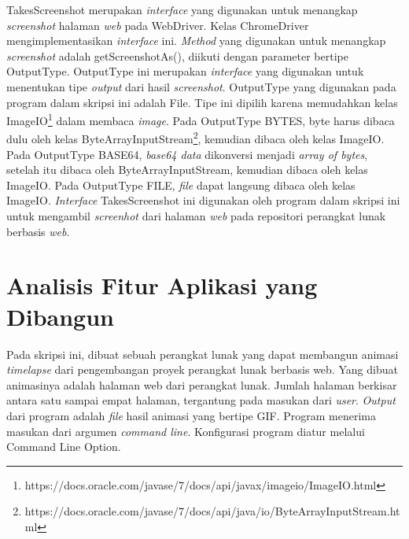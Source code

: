 TakesScreenshot merupakan \textit{interface} yang digunakan untuk menangkap \textit{screenshot} halaman \textit{web} pada WebDriver. Kelas ChromeDriver mengimplementasikan \textit{interface} ini. \textit{Method} yang digunakan untuk menangkap \textit{screenshot} adalah getScreenshotAs(), diikuti dengan parameter bertipe OutputType. OutputType ini merupakan \textit{interface} yang digunakan untuk menentukan tipe \textit{output} dari hasil \textit{screenshot}. OutputType yang digunakan pada program dalam skripsi ini adalah File.    
Tipe ini dipilih karena memudahkan kelas ImageIO\footnote{https://docs.oracle.com/javase/7/docs/api/javax/imageio/ImageIO.html} dalam membaca \textit{image}. Pada OutputType BYTES, byte harus dibaca dulu oleh kelas ByteArrayInputStream\footnote{https://docs.oracle.com/javase/7/docs/api/java/io/ByteArrayInputStream.html}, kemudian dibaca oleh kelas ImageIO. Pada OutputType BASE64, \textit{base64 data} dikonversi menjadi \textit{array of bytes}, setelah itu dibaca oleh ByteArrayInputStream, kemudian dibaca oleh kelas ImageIO. Pada OutputType FILE, \textit{file} dapat langsung dibaca oleh kelas ImageIO. \textit{Interface} TakesScreenshot ini digunakan oleh program dalam skripsi ini untuk mengambil \textit{screenhot} dari halaman \textit{web} pada repositori perangkat lunak berbasis \textit{web}. 



\section{Analisis Fitur Aplikasi yang Dibangun}
\label{sec:analisis_fitur_aplikasi}
Pada skripsi ini, dibuat sebuah perangkat lunak yang dapat membangun animasi \textit{timelapse}
dari pengembangan proyek perangkat lunak berbasis web. Yang dibuat animasinya adalah
halaman web dari perangkat lunak. Jumlah halaman berkisar antara satu sampai empat halaman, tergantung pada masukan dari \textit{user}. \textit{Output} dari program adalah \textit{file} hasil animasi yang bertipe GIF. Program menerima masukan dari argumen \textit{command line}. Konfigurasi program diatur melalui Command Line Option.
 
